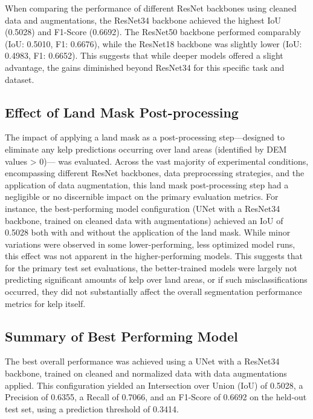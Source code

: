 \documentclass{article}
\begin{document}
When comparing the performance of different ResNet backbones using cleaned data and augmentations, the ResNet34 backbone achieved the highest IoU (0.5028) and F1-Score (0.6692). The ResNet50 backbone performed comparably (IoU: 0.5010, F1: 0.6676), while the ResNet18 backbone was slightly lower (IoU: 0.4983, F1: 0.6652). This suggests that while deeper models offered a slight advantage, the gains diminished beyond ResNet34 for this specific task and dataset.

\subsection{Effect of Land Mask Post-processing} %

The impact of applying a land mask as a post-processing step—designed to eliminate any kelp predictions occurring over land areas (identified by DEM values > 0)— was evaluated. Across the vast majority of experimental conditions, encompassing different ResNet backbones, data preprocessing strategies, and the application of data augmentation, this land mask post-processing step had a negligible or no discernible impact on the primary evaluation metrics. For instance, the best-performing model configuration (UNet with a ResNet34 backbone, trained on cleaned data with augmentations) achieved an IoU of 0.5028 both with and without the application of the land mask. While minor variations were observed in some lower-performing, less optimized model runs, this effect was not apparent in the higher-performing models. This suggests that for the primary test set evaluations, the better-trained models were largely not predicting significant amounts of kelp over land areas, or if such misclassifications occurred, they did not substantially affect the overall segmentation performance metrics for kelp itself.

\subsection{Summary of Best Performing Model} %

The best overall performance was achieved using a UNet with a ResNet34 backbone, trained on cleaned and normalized data with data augmentations applied. This configuration yielded an Intersection over Union (IoU) of 0.5028, a Precision of 0.6355, a Recall of 0.7066, and an F1-Score of 0.6692 on the held-out test set, using a prediction threshold of 0.3414.
\end{document}
